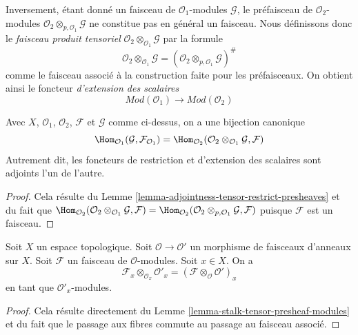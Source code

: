 \medskip\noindent
Inversement, étant donné un faisceau de $\mathcal{O}_1$-modules
$\mathcal{G}$, le préfaisceau de $\mathcal{O}_2$-modules
$\mathcal{O}_2 \otimes_{p, \mathcal{O}_1} \mathcal{G}$
ne constitue pas en général un faisceau. Nous définissons donc le
{\it faisceau produit tensoriel}
$\mathcal{O}_2 \otimes_{\mathcal{O}_1} \mathcal{G}$
par la formule
$$
\mathcal{O}_2 \otimes_{\mathcal{O}_1} \mathcal{G}
=
(\mathcal{O}_2 \otimes_{p, \mathcal{O}_1} \mathcal{G})^\#
$$
comme le faisceau associé à la construction faite pour les préfaisceaux.
On obtient ainsi le foncteur {\it d'extension des scalaires}
$$
\textit{Mod}(\mathcal{O}_1)
\longrightarrow
\textit{Mod}(\mathcal{O}_2)
$$

\begin{lemma}
\label{lemma-adjointness-tensor-restrict}
Avec $X$, $\mathcal{O}_1$, $\mathcal{O}_2$, $\mathcal{F}$ et
$\mathcal{G}$ comme ci-dessus, on a une bijection canonique
$$
\Hom_{\mathcal{O}_1}(\mathcal{G}, \mathcal{F}_{\mathcal{O}_1})
=
\Hom_{\mathcal{O}_2}(
\mathcal{O}_2 \otimes_{\mathcal{O}_1} \mathcal{G},
\mathcal{F}
)
$$
Autrement dit, les foncteurs de restriction et d'extension des scalaires
sont adjoints l'un de l'autre.
\end{lemma}

\begin{proof}
Cela résulte du
Lemme \ref{lemma-adjointness-tensor-restrict-presheaves}
et du fait que
$\Hom_{\mathcal{O}_2}(
\mathcal{O}_2 \otimes_{\mathcal{O}_1} \mathcal{G},
\mathcal{F}
)
=
\Hom_{\mathcal{O}_2}(
\mathcal{O}_2 \otimes_{p, \mathcal{O}_1} \mathcal{G},
\mathcal{F}
)$
puisque $\mathcal{F}$ est un faisceau.
\end{proof}

\begin{lemma}
\label{lemma-stalk-tensor-sheaf-modules}
Soit $X$ un espace topologique.
Soit $\mathcal{O} \to \mathcal{O}'$ un morphisme de
faisceaux d'anneaux sur $X$.
Soit $\mathcal{F}$ un faisceau de $\mathcal{O}$-modules.
Soit $x \in X$. On a
$$
\mathcal{F}_x \otimes_{\mathcal{O}_x} \mathcal{O}'_x
=
(\mathcal{F} \otimes_\mathcal{O} \mathcal{O}')_x
$$
en tant que $\mathcal{O}'_x$-modules.
\end{lemma}

\begin{proof}
Cela résulte directement du Lemme \ref{lemma-stalk-tensor-presheaf-modules}
et du fait que le passage aux fibres commute au passage au faisceau associé.
\end{proof}













